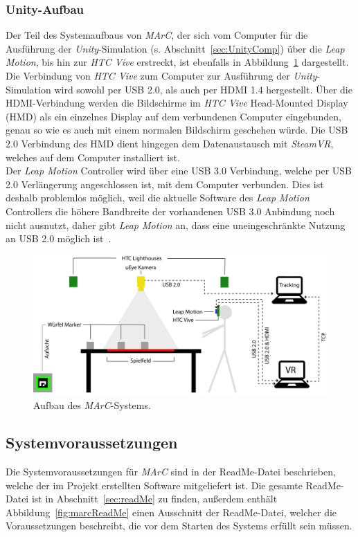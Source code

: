 \subsubsection{Unity-Aufbau}%
Der Teil des Systemaufbaus von \emph{MArC}, der sich vom Computer für die Ausführung der \emph{Unity}-Simulation (s. Abschnitt~\ref{sec:UnityComp}) über die \emph{Leap Motion}, bis hin zur \emph{HTC Vive} erstreckt, ist ebenfalls in Abbildung~\ref{fig:AufbauMarc} dargestellt.\\
Die Verbindung von \emph{HTC Vive} zum Computer zur Ausführung der \emph{Unity}-Simulation wird sowohl per USB 2.0, als auch per HDMI 1.4 hergestellt. Über die HDMI-Verbindung werden die Bildschirme im \emph{HTC Vive} Head-Mounted Display (HMD) als ein einzelnes Display auf dem verbundenen Computer eingebunden, genau so wie es auch mit einem normalen Bildschirm geschehen würde. Die USB 2.0 Verbindung des HMD dient hingegen dem Datenaustausch mit \emph{SteamVR}, welches auf dem Computer installiert ist.\\
Der \emph{Leap Motion} Controller wird über eine USB 3.0 Verbindung, welche per USB 2.0 Verlängerung angeschlossen ist, mit dem Computer verbunden. Dies ist deshalb problemlos möglich, weil die aktuelle Software des \emph{Leap Motion} Controllers die höhere Bandbreite der vorhandenen USB 3.0 Anbindung noch nicht ausnutzt, daher gibt \emph{Leap Motion} an, dass eine uneingeschränkte Nutzung an USB 2.0 möglich ist~\cite{website:LeapMotionSupportQuestion}.

\begin{figure}[H]
	\centering
	\includegraphics[width=\textwidth]{Bilder/Aufbau_MArC.jpg}
	\caption[Aufbau des \textit{MArC}-Systems]{Aufbau des \textit{MArC}-Systems.}
	\label{fig:AufbauMarc}
\end{figure}


\subsection{Systemvoraussetzungen}\label{sec:sysVor}%
Die Systemvoraussetzungen für \emph{MArC} sind in der ReadMe-Datei beschrieben, welche der im Projekt erstellten Software mitgeliefert ist. Die gesamte ReadMe-Datei ist in Abschnitt~\ref{sec:readMe} zu finden, außerdem enthält Abbildung~\ref{fig:marcReadMe} einen Ausschnitt der ReadMe-Datei, welcher die Voraussetzungen beschreibt, die vor dem Starten des Systems erfüllt sein müssen.

